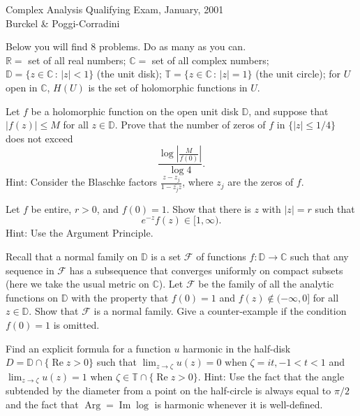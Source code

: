 \documentclass[12pt]{amsart}
\newcommand{\D}{\mathbb{D} }
\newcommand{\T}{\mathbb{T} }
\newcommand{\C}{\mathbb{C} }
\newcommand{\R}{\mathbb{R} }
\newcommand{\rea}{\operatorname{Re}}
\newcommand{\ima}{\operatorname{Im}}
\newcommand{\Arg}{\operatorname{Arg}}
\begin{document}
\baselineskip=16pt


\begin{center}{\large Complex Analysis Qualifying Exam, January, 2001\\
Burckel \& Poggi-Corradini}
\end{center}

\vfill 


  Below you will find 8 problems.
Do as many as you can.\\
 $\R =$ set of all real numbers;
$\C =$ set of all complex numbers; $\D=\{z\in\C\,:\,|z|<1\}$ (the unit
disk); $\T=\{z\in\C\,:\,|z|=1\}$ (the unit circle); for $U$ open in
$\C$, $H (U)$ is the set of holomorphic functions in $U$.

 Let $f$ be a holomorphic function on the open unit
disk $\D$, and  suppose that $|f (z)|\leq M$ for all $z\in\D $. Prove
that the number of zeros of $f$ in $\{|z|\leq  1/4 \}$ does not exceed
\[
\frac{\log \left|\frac{M}{f (0)}\right|}{\log 4}.
\]
Hint: Consider the Blaschke factors $\frac{z-z_{j}}{1-\overline
{z_{j}}z}$, where $z_{j}$ are the zeros of $f$.

\vfill 


 Let $f$ be entire, $r>0$, and $f (0)=1$. Show that
there is $z$ with $|z|=r$ such that 
\[
e^{-z}f (z)\in [1,\infty ).
\]
Hint: Use the Argument Principle.

\vfill 


 Recall that a normal family on $\D $ is a set
$\mathcal{F}$ of 
functions $f: \D \rightarrow \C$ such that any sequence in
$\mathcal{F}$ has a subsequence that converges uniformly on compact
subsets (here we take the usual metric on $\C$). Let $\mathcal{F}$ be
the family of all the analytic functions on $\D $ with the property
that $f (0)=1$ and $f (z)\not\in (-\infty,0]$ for all $z\in\D $. Show that
$\mathcal{F}$ is a normal family. Give a counter-example if the
condition $f (0)=1$ is omitted.

\vfill 


 Find an explicit formula for a function $u$ harmonic in the
half-disk $D=\D \cap \{\rea z>0 \}$ such that 
$\lim _{z\rightarrow \zeta }u (z)=0\mbox { when }\zeta =it, -1<t<1$
and 
$\lim _{z\rightarrow \zeta}u (z)=1 \mbox { when }\zeta\in \T \cap
\{\rea z>0 \}. $
Hint: Use the fact that the angle subtended by the diameter from a point
on the half-circle is always equal to $\pi/2$ and the fact that
$\Arg=\ima\log$ is harmonic whenever it is well-defined.
\end{document}

